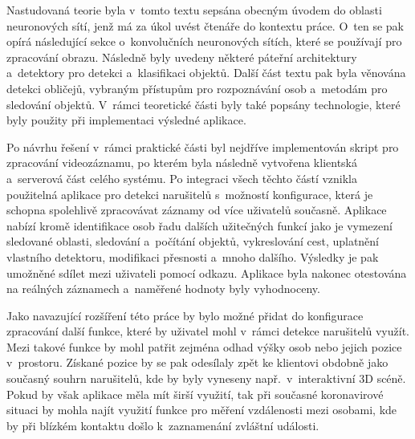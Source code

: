 Nastudovaná teorie byla v~tomto textu sepsána obecným úvodem do oblasti neuronových sítí, jenž má za úkol uvést čtenáře do kontextu práce. O~ten se pak opírá následující sekce o~konvolučních neuronových sítích, které se používají pro zpracování obrazu. Následně byly uvedeny některé páteřní architektury a~detektory pro detekci a~klasifikaci objektů. Další část textu pak byla věnována detekci obličejů, vybraným přístupům pro rozpoznávání osob a~metodám pro sledování objektů. V~rámci teoretické části byly také popsány technologie, které byly použity při implementaci výsledné aplikace.

Po návrhu řešení v~rámci praktické části byl nejdříve implementován skript pro zpracování videozáznamu, po kterém byla následně vytvořena klientská a~serverová část celého systému. Po integraci všech těchto částí vznikla použitelná aplikace pro detekci narušitelů s~možností konfigurace, která je schopna spolehlivě zpracovávat záznamy od více uživatelů současně. Aplikace nabízí kromě identifikace osob řadu dalších užitečných funkcí jako je vymezení sledované oblasti, sledování a~počítání objektů, vykreslování cest, uplatnění vlastního detektoru, modifikaci přesnosti a~mnoho dalšího. Výsledky je pak umožněné sdílet mezi uživateli pomocí odkazu. Aplikace byla nakonec otestována na reálných záznamech a~naměřené hodnoty byly vyhodnoceny.

Jako navazující rozšíření této práce by bylo možné přidat do konfigurace zpracování další funkce, které by uživatel mohl v~rámci detekce narušitelů využít. Mezi takové funkce by mohl patřit zejména odhad výšky osob nebo jejich pozice v~prostoru. Získané pozice by se pak odesílaly zpět ke klientovi obdobně jako současný souhrn narušitelů, kde by byly vyneseny např.~v~interaktivní 3D scéně. Pokud by však aplikace měla mít širší využití, tak při současné koronavirové situaci by mohla najít využití funkce pro měření vzdálenosti mezi osobami, kde by při blízkém kontaktu došlo k~zaznamenání zvláštní události.
